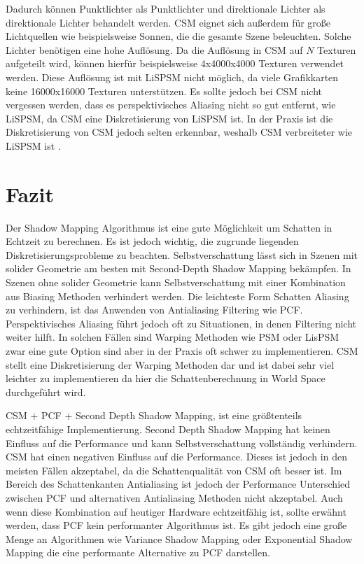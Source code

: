 Dadurch können Punktlichter als Punktlichter und direktionale Lichter als direktionale Lichter behandelt werden.
CSM eignet sich außerdem für große Lichtquellen wie beispielsweise Sonnen, die die gesamte Szene beleuchten.
Solche Lichter benötigen eine hohe Auflösung. 
Da die Auflösung in CSM auf $N$ Texturen aufgeteilt wird, können hierfür beispielsweise 4x4000x4000 Texturen verwendet werden. 
Diese Auflösung ist mit LiSPSM nicht möglich, da viele Grafikkarten keine 16000x16000 Texturen unterstützen.
Es sollte jedoch bei CSM nicht vergessen werden, dass es perspektivisches Aliasing nicht so gut entfernt, wie 
LiSPSM, da CSM eine Diskretisierung von LiSPSM ist.
In der Praxis ist die Diskretisierung von CSM jedoch selten erkennbar, weshalb CSM verbreiteter wie LiSPSM ist \cite{Survey2011}.

\chapter{Fazit}
Der Shadow Mapping Algorithmus ist eine gute Möglichkeit um Schatten in Echtzeit zu berechnen.
Es ist jedoch wichtig, die zugrunde liegenden Diskretisierungsprobleme zu beachten.
Selbstverschattung lässt sich in Szenen mit solider Geometrie am besten mit Second-Depth Shadow Mapping bekämpfen.
In Szenen ohne solider Geometrie kann Selbstverschattung mit einer Kombination aus Biasing Methoden verhindert werden.
Die leichteste Form Schatten Aliasing zu verhindern, ist das Anwenden von Antialiasing Filtering wie PCF.
Perspektivisches Aliasing führt jedoch oft zu Situationen, in denen Filtering nicht weiter hilft.
In solchen Fällen sind Warping Methoden wie PSM oder LisPSM zwar eine gute Option sind aber in der Praxis oft schwer zu implementieren.
CSM stellt eine Diskretisierung der Warping Methoden dar und ist dabei sehr viel leichter zu implementieren da hier die Schattenberechnung in 
World Space durchgeführt wird.
\par
CSM + PCF + Second Depth Shadow Mapping, ist eine größtenteils echtzeitfähige Implementierung.
Second Depth Shadow Mapping hat keinen Einfluss auf die Performance und kann Selbstverschattung vollständig verhindern.
CSM hat einen negativen Einfluss auf die Performance.
Dieses ist jedoch in den meisten Fällen akzeptabel, da die Schattenqualität von CSM oft besser ist.
Im Bereich des Schattenkanten Antialiasing ist jedoch der Performance Unterschied zwischen PCF und alternativen 
Antialiasing Methoden nicht akzeptabel.
Auch wenn diese Kombination auf heutiger Hardware echtzeitfähig ist, 
sollte erwähnt werden, dass PCF kein performanter Algorithmus ist. 
Es gibt jedoch eine große Menge an Algorithmen wie Variance Shadow Mapping oder Exponential Shadow Mapping die 
eine performante Alternative zu PCF darstellen.

















